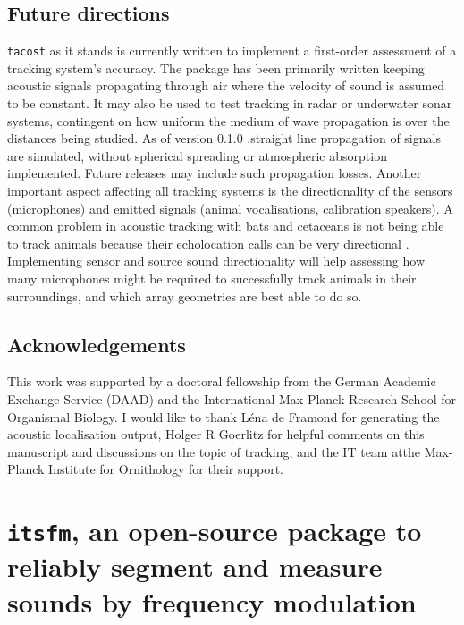 \documentclass[
]{book}
\begin{document}
\hypertarget{future-directions}{%
\section{Future directions}\label{future-directions}}

\texttt{tacost} as it stands is currently written to implement a first-order assessment of a tracking system's accuracy. The package has been primarily written keeping acoustic signals propagating through air where the velocity of sound is assumed to be constant. It may also be used to test tracking in radar or underwater sonar systems, contingent on how uniform the medium of wave propagation is over the distances being studied. As of version 0.1.0
,straight line propagation of signals are simulated, without spherical spreading or atmospheric absorption implemented. Future releases may include such propagation losses. Another important aspect affecting all tracking systems is the directionality of the sensors (microphones) and emitted signals (animal vocalisations, calibration speakers). A common problem in acoustic tracking with bats and cetaceans is not being able to track animals because their echolocation calls can be very directional \citep{Matsuta2013, Surlykke2012, Koblitz2016}. Implementing sensor and source sound directionality will help assessing how many microphones might be required to successfully track animals in their surroundings, and which array geometries are best able to do so.

\hypertarget{acknowledgements}{%
\section{Acknowledgements}\label{acknowledgements}}

This work was supported by a doctoral fellowship from the German Academic Exchange Service (DAAD) and the International Max Planck Research School for Organismal Biology.
I would like to thank Léna de Framond for generating the acoustic localisation output, Holger R Goerlitz for helpful comments on this manuscript and discussions on the topic of tracking, and the IT team atthe Max-Planck Institute for Ornithology for their support.

\hypertarget{itsfm}{%
\chapter{\texorpdfstring{\texttt{itsfm}, an open-source package to reliably segment and measure sounds by frequency modulation}{itsfm, an open-source package to reliably segment and measure sounds by frequency modulation}}\label{itsfm}}
\end{document}
